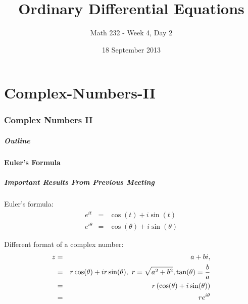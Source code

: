\part{Complex-Numbers-II}
\section{Complex Numbers II}

\title{Ordinary Differential Equations}
\subtitle{Math 232 - Week 4, Day 2}
\date{18 September 2013}

\begin{frame}
  \titlepage
\end{frame}

\begin{frame}
  \frametitle{Outline}
  \tableofcontents[currentsection]
\end{frame}

\subsection{Euler's Formula}
\begin{frame}
  \frametitle{Important Results From Previous Meeting}

  Euler's formula:
  \begin{eqnarray*}
    e^{it} & = & \cos(t) + i\sin(t)\\
    e^{i\theta} & = & \cos(\theta) + i\sin(\theta)
  \end{eqnarray*}

  Different format of a complex number:
    \begin{eqnarray*}
    z & = & a + bi, \\
    & = & r\cos(\theta) + ir\sin(\theta), ~ r = \sqrt{a^2+b^2}, \tan(\theta)=\frac{b}{a} \\
    & = & r \left( \cos(\theta) + i\sin(\theta) \right) \\
    & = & r e^{i\theta}
  \end{eqnarray*}

\end{frame}

